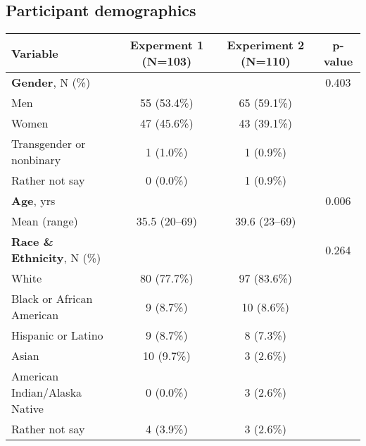\documentclass[a4paper,12pt]{article}
\begin{document}
\begin{refsection}[supp]
\clearpage
\subsection*{Participant demographics}

\begin{table}[h]
    \centering
    \begin{tabular*}{\textwidth}{lccc}
    \toprule
    Variable & \small Experment 1 (N=103) & \small Experiment 2 (N=110)  & p-value \\
    \midrule
    \textbf{Gender}, N (\%)                & & & 0.403 \\
    \hspace{1em} Men                       & 55 (53.4\%) & 65 (59.1\%) & \\
    \hspace{1em} Women                     & 47 (45.6\%) & 43 (39.1\%) & \\
    \hspace{1em} Transgender or nonbinary         &   1  (1.0\%) &   1  (0.9\%) & \\
    \hspace{1em} Rather not say            &   0  (0.0\%) &   1  (0.9\%) & \\
    \midrule
    \textbf{Age}, yrs                      & & & 0.006 \\
    \hspace{1em} Mean (range)              & 35.5 (20--69) & 39.6 (23--69) & \\
    \midrule
    \textbf{Race \& Ethnicity}, N (\%)                  & & & 0.264 \\
    \hspace{1em} White                     & 80 (77.7\%) &  97 (83.6\%) & \\ 
    \hspace{1em} Black or African American &  9  (8.7\%) &  10  (8.6\%) & \\
    \hspace{1em} Hispanic or Latino        &  9  (8.7\%) &  8  (7.3\%) & \\
    \hspace{1em} Asian                     & 10  (9.7\%) &   3  (2.6\%) & \\
    \hspace{1em} American Indian/Alaska Native & 0 (0.0\%) & 3 (2.6\%) & \\
    \hspace{1em} Rather not say            &  4  (3.9\%) &  3  (2.6\%) & \\

\end{tabular*}
\end{table}
\end{refsection}
\end{document}
